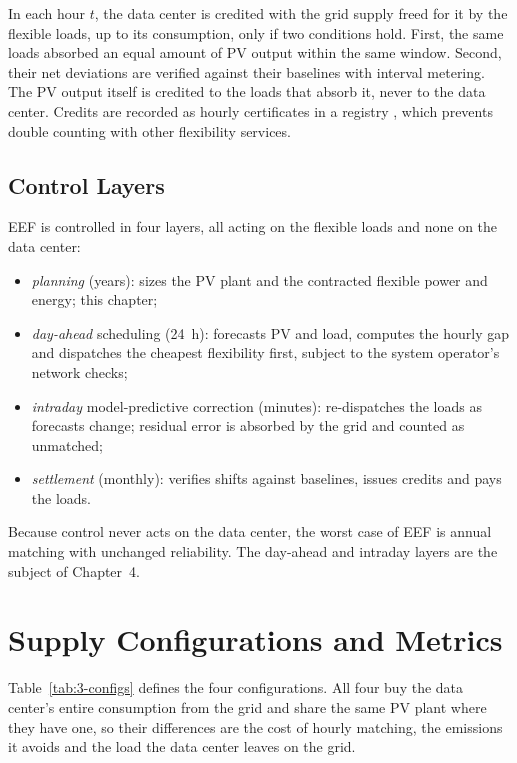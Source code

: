 In each hour $t$, the data center is credited with the grid supply freed for it by the flexible loads, up to its consumption, only if two conditions hold. First, the same loads absorbed an equal amount of PV output within the same window. Second, their net deviations are verified against their baselines with interval metering. The PV output itself is credited to the loads that absorb it, never to the data center. Credits are recorded as hourly certificates in a registry \cite{r51}, which prevents double counting with other flexibility services.

\subsection{Control Layers}

EEF is controlled in four layers, all acting on the flexible loads and none on the data center:
\begin{itemize}
\item \emph{planning} (years): sizes the PV plant and the contracted flexible power and energy; this chapter;
\item \emph{day-ahead} scheduling (24~h): forecasts PV and load, computes the hourly gap and dispatches the cheapest flexibility first, subject to the system operator's network checks;
\item \emph{intraday} model-predictive correction (minutes): re-dispatches the loads as forecasts change; residual error is absorbed by the grid and counted as unmatched;
\item \emph{settlement} (monthly): verifies shifts against baselines, issues credits and pays the loads.
\end{itemize}
Because control never acts on the data center, the worst case of EEF is annual matching with unchanged reliability. The day-ahead and intraday layers are the subject of Chapter~4.

\section{Supply Configurations and Metrics}\label{sec:3-3}

Table~\ref{tab:3-configs} defines the four configurations. All four buy the data center's entire consumption from the grid and share the same PV plant where they have one, so their differences are the cost of hourly matching, the emissions it avoids and the load the data center leaves on the grid.


